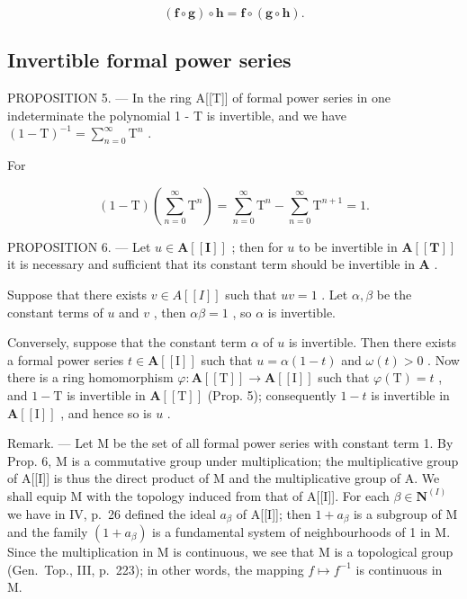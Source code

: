 \[
(\mathbf {f} \circ \mathbf {g}) \circ \mathbf {h} = \mathbf {f} \circ (\mathbf {g} \circ \mathbf {h}).\tag{5}
\]

\subsection{Invertible formal power series}

PROPOSITION 5. --- In the ring A{[}{[}T{]}{]} of formal power series in one indeterminate the polynomial 1 - T is invertible, and we have \((1 - \mathrm{T})^{-1} = \sum_{n=0}^{\infty} \mathrm{T}^{n}\) .

For

\[
(1 - \mathrm{T}) \left(\sum_ {n = 0} ^ {\infty} \mathrm{T} ^ {n}\right) = \sum_ {n = 0} ^ {\infty} \mathrm{T} ^ {n} - \sum_ {n = 0} ^ {\infty} \mathrm{T} ^ {n + 1} = 1.
\]

PROPOSITION 6. --- Let \(u \in \mathbf{A}[[\mathbf{I}]]\) ; then for \(u\) to be invertible in \(\mathbf{A}[[\mathbf{T}]]\) it is necessary and sufficient that its constant term should be invertible in \(\mathbf{A}\) .

Suppose that there exists \(v \in A[[I]]\) such that \(uv = 1\) . Let \(\alpha, \beta\) be the constant terms of \(u\) and \(v\) , then \(\alpha\beta = 1\) , so \(\alpha\) is invertible.

Conversely, suppose that the constant term \(\alpha\) of \(u\) is invertible. Then there exists a formal power series \(t \in \mathbf{A}[[\mathrm{I}]]\) such that \(u = \alpha(1 - t)\) and \(\omega(t) > 0\) . Now there is a ring homomorphism \(\varphi: \mathbf{A}[[\mathrm{T}]] \to \mathbf{A}[[\mathrm{I}]]\) such that \(\varphi(\mathrm{T}) = t\) , and \(1 - \mathrm{T}\) is invertible in \(\mathbf{A}[[\mathrm{T}]]\) (Prop. 5); consequently \(1 - t\) is invertible in \(\mathbf{A}[[\mathrm{I}]]\) , and hence so is \(u\) .

Remark. --- Let M be the set of all formal power series with constant term 1. By Prop. 6, M is a commutative group under multiplication; the multiplicative group of A{[}{[}I{]}{]} is thus the direct product of M and the multiplicative group of A. We shall equip M with the topology induced from that of A{[}{[}I{]}{]}. For each \(\beta \in \mathbf{N}^{(I)}\) we have in IV, p.~26 defined the ideal \(a_{\beta}\) of A{[}{[}I{]}{]}; then \(1 + a_{\beta}\) is a subgroup of M and the family \((1 + a_{\beta})\) is a fundamental system of neighbourhoods of 1 in M. Since the multiplication in M is continuous, we see that M is a topological group (Gen.~Top., III, p.~223); in other words, the mapping \(f \mapsto f^{-1}\) is continuous in M.

